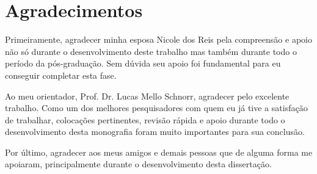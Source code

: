 \chapter*{Agradecimentos}

Primeiramente, agradecer minha esposa Nicole dos Reis pela compreensão e 
apoio não só durante o desenvolvimento deste trabalho mas também durante todo o 
período da pós-graduação. Sem dúvida seu apoio foi fundamental para eu conseguir
completar esta fase.

Ao meu orientador, Prof. Dr. Lucas Mello Schnorr, agradecer pelo excelente 
trabalho. Como um dos melhores pesquisadores com quem eu já tive a satisfação 
de trabalhar, colocações pertinentes, revisão rápida e apoio durante 
todo o desenvolvimento desta monografia foram muito importantes para sua 
conclusão.

Por último, agradecer aos meus amigos e demais pessoas que de alguma forma me 
apoiaram, principalmente durante o desenvolvimento desta dissertação. 

